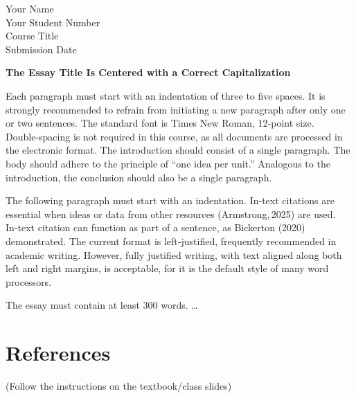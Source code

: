 \documentclass[uplatex,dvipdfmx,a4paper,11pt]{jsarticle}
\begin{document}
\begin{flushleft}
Your Name\\
Your Student Number\\
Course Title\\
Submission Date\\
\end{flushleft}

\vspace{2\baselineskip}

\begin{center}
{\Large\bfseries The Essay Title Is Centered with a Correct Capitalization}
\end{center}

\vspace{2\baselineskip}

Each paragraph must start with an indentation of three to five spaces. It is strongly
recommended to refrain from initiating a new paragraph after only one or two
sentences. The standard font is Times New Roman, 12‑point size. Double‑spacing
is not required in this course, as all documents are processed in the electronic
format. The introduction should consist of a single paragraph. The body should
adhere to the principle of ``one idea per unit.'' Analogous to the introduction, the
conclusion should also be a single paragraph.

\par

The following paragraph must start with an indentation. In‑text citations are
essential when ideas or data from other resources (Armstrong, 2025) are used.
In‑text citation can function as part of a sentence, as Bickerton (2020) demonstrated.
The current format is left‑justified, frequently recommended in academic writing.
However, fully justified writing, with text aligned along both left and right margins,
is acceptable, for it is the default style of many word processors.

\par

The essay must contain at least 300 words. \dots

\vspace{2\baselineskip}

\section*{References}

(Follow the instructions on the textbook/class slides)
\end{document}
